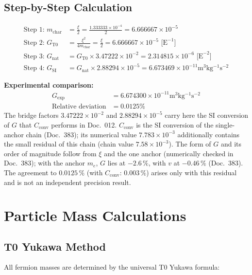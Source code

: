 	\subsection{Step-by-Step Calculation}
	
	\begin{align}
		\text{Step 1: } m_{\text{char}} &= \frac{\xi}{2} = \frac{1.333333 \times 10^{-4}}{2} = 6.666667 \times 10^{-5} \\
		\text{Step 2: } G_{\text{T0}} &= \frac{\xi^2}{4m_{\text{char}}} = \frac{\xi}{2} = 6.666667 \times 10^{-5} \text{ [E}^{-1}\text{]} \\
		\text{Step 3: } G_{\text{nat}} &= G_{\text{T0}} \times 3.47222 \times 10^{-2} = 2.314815 \times 10^{-6} \text{ [E}^{-2}\text{]} \\
		\text{Step 4: } G_{\text{SI}} &= G_{\text{nat}} \times 2.88294 \times 10^{-5} = 6.673469 \times 10^{-11} \si{\meter^3 \kilogram^{-1} \second^{-2}}
	\end{align}
	
	\textbf{Experimental comparison:}
	\begin{align}
		G_{\text{exp}} &= 6.674300 \times 10^{-11} \si{\meter^3 \kilogram^{-1} \second^{-2}} \\
		\text{Relative deviation} &= 0.0125\%
	\end{align}
		The bridge factors $3.47222\times10^{-2}$ and $2.88294\times10^{-5}$ carry here the SI conversion of $G$ that $C_{\text{conv}}$ performs in Doc.~012. $C_{\text{conv}}$ is the SI conversion of the single-anchor chain (Doc.~383); its numerical value $7.783\times10^{-3}$ additionally contains the small residual of this chain (chain value $7.58\times10^{-3}$). The form of $G$ and its order of magnitude follow from $\xi$ and the one anchor (numerically checked in Doc.~383); with the anchor $m_e$, $G$ lies at $-2.6\,\%$, with $v$ at $-0.46\,\%$ (Doc.~383). The agreement to $0.0125\,\%$ (with $C_{\text{conv}}$: $0.003\,\%$) arises only with this residual and is not an independent precision result.
	
	\section{Particle Mass Calculations}
	
	\subsection{T0 Yukawa Method}
	
	All fermion masses are determined by the universal T0 Yukawa formula:
	
